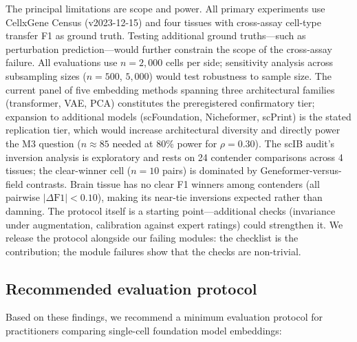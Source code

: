 \documentclass[10pt,letterpaper]{article}
\begin{document}
The principal limitations are scope and power. All primary experiments use CellxGene Census (v2023-12-15) and four tissues with cross-assay cell-type transfer F1 as ground truth. Testing additional ground truths---such as perturbation prediction---would further constrain the scope of the cross-assay failure. All evaluations use $n = 2{,}000$ cells per side; sensitivity analysis across subsampling sizes ($n = 500$, $5{,}000$) would test robustness to sample size. The current panel of five embedding methods spanning three architectural families (transformer, VAE, PCA) constitutes the preregistered confirmatory tier; expansion to additional models (scFoundation, Nicheformer, scPrint) is the stated replication tier, which would increase architectural diversity and directly power the M3 question ($n \approx 85$ needed at 80\% power for $\rho = 0.30$). The scIB audit's inversion analysis is exploratory and rests on 24 contender comparisons across 4 tissues; the clear-winner cell ($n = 10$ pairs) is dominated by Geneformer-versus-field contrasts. Brain tissue has no clear F1 winners among contenders (all pairwise $|\Delta\text{F1}| < 0.10$), making its near-tie inversions expected rather than damning. The protocol itself is a starting point---additional checks (invariance under augmentation, calibration against expert ratings) could strengthen it. We release the protocol alongside our failing modules: the checklist is the contribution; the module failures show that the checks are non-trivial.

\subsection{Recommended evaluation protocol}

Based on these findings, we recommend a minimum evaluation protocol for practitioners comparing single-cell foundation model embeddings:
\end{document}
